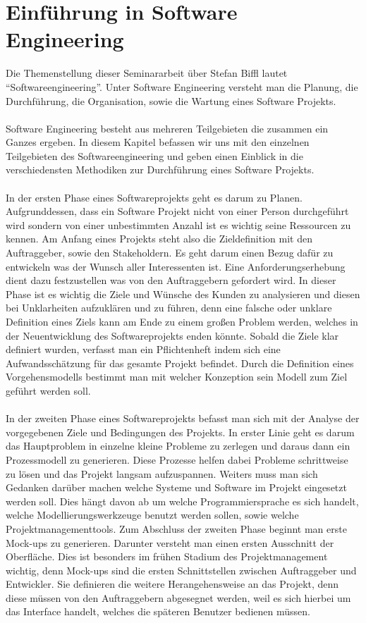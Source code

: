 \documentclass{llncs}
\begin{document}

\section{Einführung in Software Engineering}

Die Themenstellung dieser Seminararbeit über Stefan Biffl lautet “Softwareengineering”. Unter Software Engineering versteht man die Planung, die Durchführung, die Organisation, sowie die Wartung eines Software Projekts. 
\\ \\
Software Engineering besteht aus mehreren Teilgebieten die zusammen ein Ganzes ergeben. In diesem Kapitel befassen wir uns mit den einzelnen Teilgebieten des Softwareengineering und geben einen Einblick in die verschiedensten Methodiken zur Durchführung eines Software Projekts.
\\ \\
In der ersten Phase eines Softwareprojekts geht es darum zu Planen. Aufgrunddessen, dass ein Software Projekt nicht von einer Person durchgeführt wird sondern von einer unbestimmten Anzahl ist es wichtig seine Ressourcen zu kennen. Am Anfang eines Projekts steht also die Zieldefinition mit den Auftraggeber, sowie den Stakeholdern. Es geht darum einen Bezug dafür zu entwickeln was der Wunsch aller Interessenten ist. Eine Anforderungserhebung dient dazu festzustellen was von den Auftraggebern gefordert wird. In dieser Phase ist es wichtig die Ziele und Wünsche des Kunden zu analysieren und diesen bei Unklarheiten aufzuklären und zu führen, denn eine falsche oder unklare Definition eines Ziels kann am Ende zu einem großen Problem werden, welches in der Neuentwicklung des Softwareprojekts enden könnte. Sobald die Ziele klar definiert wurden, verfasst man ein Pflichtenheft indem sich eine Aufwandsschätzung für das gesamte Projekt befindet. Durch die Definition eines Vorgehensmodells bestimmt man mit welcher Konzeption sein Modell zum Ziel geführt werden soll.
\\ \\
In der zweiten Phase eines Softwareprojekts befasst man sich mit der Analyse der vorgegebenen Ziele und Bedingungen des Projekts. In erster Linie geht es darum das Hauptproblem in einzelne kleine Probleme zu zerlegen und daraus dann ein Prozessmodell zu generieren. Diese Prozesse helfen dabei Probleme schrittweise zu lösen und das Projekt langsam aufzuspannen. Weiters muss man sich Gedanken darüber machen welche Systeme und Software im Projekt eingesetzt werden soll. Dies hängt davon ab um welche Programmiersprache es sich handelt, welche Modellierungswerkzeuge benutzt werden sollen, sowie welche Projektmanagementtools. Zum Abschluss der zweiten Phase beginnt man erste Mock-ups zu generieren. Darunter versteht man einen ersten Ausschnitt der Oberfläche. Dies ist besonders im frühen Stadium des Projektmanagement wichtig, denn Mock-ups sind die ersten Schnittstellen zwischen Auftraggeber und Entwickler. Sie definieren die weitere Herangehensweise an das Projekt, denn diese müssen von den Auftraggebern abgesegnet werden, weil es sich hierbei um das Interface handelt, welches die späteren Benutzer bedienen müssen.
\end{document}
